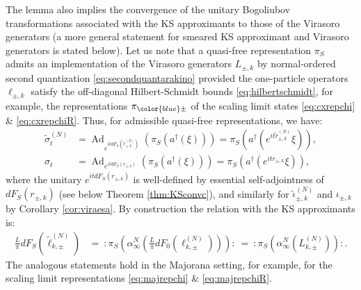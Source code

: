 \documentclass[a4paper, 11pt]{article}
\DeclareMathOperator{\Ad}{Ad}
\DeclareMathOperator{\1}{\mathds{1}}
\begin{document}
The lemma also implies the convergence of the unitary Bogoliubov transformations associated with the KS approximants to those of the Virasoro generators (a more general statement for smeared KS approximant and Virasoro generators is stated below). Let us note that a quasi-free representation $\pi_{S}$ admits an implementation of the Virasoro generators $L_{\pm,k}$ by normal-ordered second quantization \eqref{eq:secondquantarakino} provided the one-particle operators $\ell_{\pm,k}$ satisfy the off-diagonal Hilbert-Schmidt bounds \eqref{eq:hilbertschmidt}, for example, the representations $\pi_{{\color{blue}\pm}}$ of the scaling limit states \eqref{eq:cxrepchi} \& \eqref{eq:cxrepchiR}. Thus, for admissible quasi-free representations, we have:
\begin{align}
\label{eq:KSconvgroup}
\tilde{\sigma}^{(N)}_{t} & = \Ad_{e^{it dF_{S}(\tilde{r}^{(N)}_{\pm,k})}}(\pi_{S}(a^{\dagger}(\xi)\!)\!) = \pi_{S}(a^{\dagger}(e^{it \tilde{r}^{(N)}_{\pm,k}}\xi)\!), \\ \nonumber
\sigma_{t} & = \Ad_{e^{it dF_{S}(r_{\pm,k})}}(\pi_{S}(a^{\dagger}(\xi)\!)\!) = \pi_{S}(a^{\dagger}(e^{it r_{\pm,k}}\xi)\!),
\end{align}
where the unitary $e^{it dF_{S}(r_{\pm,k})}$ is well-defined by essential self-adjointness of $dF_{S}(r_{\pm,k})$ (see below Theorem \ref{thm:KSconvc}), and similarly for $\tilde{\iota}^{(N)}_{\pm,k}$ and $\iota_{\pm,k}$ by Corollary \ref{cor:viraesa}. By construction the relation with the KS approximants is:
\begin{align}
\label{eq:KShermiteanparts}
\tfrac{L}{\pi}dF_{S}(\tilde{\ell}^{(N)}_{k,\pm}) & =\ :\pi_{S}(\alpha^{N}_{\infty}(\tfrac{L}{\pi}dF_{0}(\ell^{(N)}_{k,\pm}))):\ =\ :\pi_{S}(\alpha^{N}_{\infty}(L^{(N)}_{k,\pm})):. 
\end{align}
The analogous statements hold in the Majorana setting, for example, for the scaling limit representations \eqref{eq:majrepchi} \& \eqref{eq:majrepchiR}.
\end{document}
